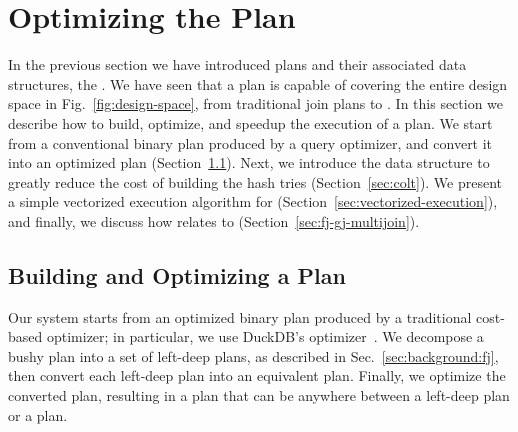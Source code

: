 \section{Optimizing the \FJ Plan}

\label{sec:optimization}

In the previous section we have introduced \FJ plans and their associated
data structures, the \GHTs.  We have seen that a \FJ plan is capable
of covering the entire design space in Fig.~\ref{fig:design-space},
from traditional join plans to \GJ.  In this section we describe how
to build, optimize, and speedup the execution of a \FJ plan.  We start
from a conventional binary plan produced by a query optimizer, and convert
it into an optimized \FJ plan (Section~\ref{sec:bj-to-fj}). Next, we
introduce the \COLT data structure to greatly reduce the cost of
building the hash tries (Section~\ref{sec:colt}).  We present a simple
vectorized execution algorithm for \FJ
(Section~\ref{sec:vectorized-execution}), and finally, we discuss how
\FJ relates to \GJ (Section~\ref{sec:fj-gj-multijoin}).


\subsection{Building and Optimizing a \FJ Plan}\label{sec:bj-to-fj}

Our system starts from an optimized binary plan produced by a
traditional cost-based optimizer; in particular, we use DuckDB's
optimizer~\cite{DBLP:conf/cidr/RaasveldtM20,DBLP:conf/vldb/Raasveldt22}. We
decompose a bushy plan into a set of left-deep plans, as described in
Sec.~\ref{sec:background:fj}, then convert each left-deep plan into an
equivalent \FJ plan.  Finally, we optimize the converted \FJ plan,
resulting in a plan that can be anywhere between a left-deep plan or a
\GJ plan.

